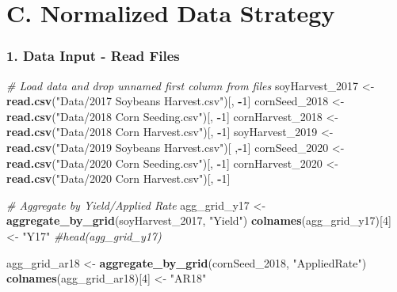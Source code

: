 \documentclass[
]{article}
\newenvironment{Shaded}{\begin{snugshade}}{\end{snugshade}}
\newcommand{\CommentTok}[1]{\textcolor[rgb]{0.56,0.35,0.01}{\textit{#1}}}
\newcommand{\DecValTok}[1]{\textcolor[rgb]{0.00,0.00,0.81}{#1}}
\newcommand{\FunctionTok}[1]{\textcolor[rgb]{0.13,0.29,0.53}{\textbf{#1}}}
\newcommand{\NormalTok}[1]{#1}
\newcommand{\OtherTok}[1]{\textcolor[rgb]{0.56,0.35,0.01}{#1}}
\newcommand{\SpecialCharTok}[1]{\textcolor[rgb]{0.81,0.36,0.00}{\textbf{#1}}}
\newcommand{\StringTok}[1]{\textcolor[rgb]{0.31,0.60,0.02}{#1}}
\begin{document}
\section{C. Normalized Data Strategy}\label{c.-normalized-data-strategy}

\subsubsection{1. Data Input - Read
Files}\label{data-input---read-files-1}

\begin{Shaded}
\begin{Highlighting}[]
\CommentTok{\# Load data and drop unnamed first column from files}
\NormalTok{soyHarvest\_2017 }\OtherTok{\textless{}{-}} \FunctionTok{read.csv}\NormalTok{(}\StringTok{"Data/2017 Soybeans Harvest.csv"}\NormalTok{)[, }\SpecialCharTok{{-}}\DecValTok{1}\NormalTok{]}
\NormalTok{cornSeed\_2018 }\OtherTok{\textless{}{-}} \FunctionTok{read.csv}\NormalTok{(}\StringTok{"Data/2018 Corn Seeding.csv"}\NormalTok{)[, }\SpecialCharTok{{-}}\DecValTok{1}\NormalTok{]}
\NormalTok{cornHarvest\_2018 }\OtherTok{\textless{}{-}} \FunctionTok{read.csv}\NormalTok{(}\StringTok{"Data/2018 Corn Harvest.csv"}\NormalTok{)[, }\SpecialCharTok{{-}}\DecValTok{1}\NormalTok{]}
\NormalTok{soyHarvest\_2019 }\OtherTok{\textless{}{-}} \FunctionTok{read.csv}\NormalTok{(}\StringTok{"Data/2019 Soybeans Harvest.csv"}\NormalTok{)[ ,}\SpecialCharTok{{-}}\DecValTok{1}\NormalTok{]}
\NormalTok{cornSeed\_2020 }\OtherTok{\textless{}{-}} \FunctionTok{read.csv}\NormalTok{(}\StringTok{"Data/2020 Corn Seeding.csv"}\NormalTok{)[, }\SpecialCharTok{{-}}\DecValTok{1}\NormalTok{]}
\NormalTok{cornHarvest\_2020 }\OtherTok{\textless{}{-}} \FunctionTok{read.csv}\NormalTok{(}\StringTok{"Data/2020 Corn Harvest.csv"}\NormalTok{)[, }\SpecialCharTok{{-}}\DecValTok{1}\NormalTok{]}

\CommentTok{\# Aggregate by Yield/Applied Rate}
\NormalTok{agg\_grid\_y17 }\OtherTok{\textless{}{-}} \FunctionTok{aggregate\_by\_grid}\NormalTok{(soyHarvest\_2017, }\StringTok{"Yield"}\NormalTok{)}
\FunctionTok{colnames}\NormalTok{(agg\_grid\_y17)[}\DecValTok{4}\NormalTok{] }\OtherTok{\textless{}{-}} \StringTok{"Y17"}
\CommentTok{\#head(agg\_grid\_y17)}

\NormalTok{agg\_grid\_ar18 }\OtherTok{\textless{}{-}} \FunctionTok{aggregate\_by\_grid}\NormalTok{(cornSeed\_2018, }\StringTok{"AppliedRate"}\NormalTok{)}
\FunctionTok{colnames}\NormalTok{(agg\_grid\_ar18)[}\DecValTok{4}\NormalTok{] }\OtherTok{\textless{}{-}} \StringTok{"AR18"}


\end{Highlighting}
\end{Shaded}
\end{document}
